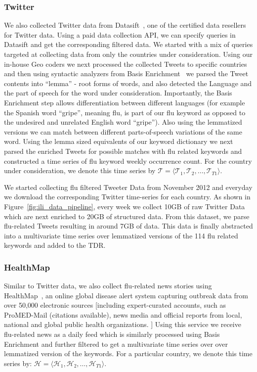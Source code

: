 \subsubsection{Twitter} 
We also collected Twitter data from Datasift~\cite{Twitter:2013},
one of the certified data resellers for
Twitter data. Using a paid data collection API, we can specify queries in
Datasift and get the corresponding filtered data.  We started with a mix of
queries targeted at collecting data from only the countries under
consideration. Using our in-house Geo coders we next processed the collected
Tweets to specific countries and then using syntactic analyzers from Basis
Enrichment~\cite{Basis:2013} we parsed the Tweet contents into ``lemma'' - root
forms of words, and also detected the Language and the part of speech for the
word under consideration.  Importantly, the Basis Enrichment step allows
differentiation between different languages (for example the Spanish word
``gripe'', meaning flu, is part of our flu keyword as opposed to the undesired
and unrelated English word ``gripe''). Also using the lemmatized versions we
can match between different parts-of-speech variations of the same word. Using
the lemma sized equivalents of our keyword dictionary we next parsed the
enriched Tweets for possible matches with flu related keywords and constructed
a time series of flu keyword weekly occurrence count. For the country under
consideration, we denote this time series by 
$\mathcal{T} = \langle \mathcal{T}_1, \mathcal{T}_2, \dots, \mathcal{T}_{T1} \rangle$.

We started collecting flu filtered Tweeter Data from November 2012 and everyday
we download the corresponding Twitter time-series for each country. As shown in
Figure~\ref{fig:ili_data_pipeline}, every week we collect 10GB of raw Twitter
Data which are next enriched to 20GB of structured data. From this dataset, we
parse flu-related Tweets resulting in around 7GB of data. This data is finally
abstracted into a multivariate time series over lemmatized versions of the 114
flu related keywords and added to the TDR. 

\subsubsection{HealthMap} 
Similar to Twitter data, we also collect flu-related
news stories using HealthMap~\cite{HM:2013}, an online global disease alert
system capturing outbreak data from over 50,000 electronic sources [including
expert-curated accounts, such as ProMED-Mail (citations available), news media
and official reports from local, national and global public health
organizations. ] Using this service we receive flu-related news as a daily feed
which is similarly processed using Basis Enrichment and further filtered to get
a multivariate time series over over lemmatized version of the keywords. For a
particular country, we denote this time series by: 
$\mathcal{H} = \langle \mathcal{H}_1, \mathcal{H}_2, \dots, \mathcal{H}_{T1} \rangle$.

